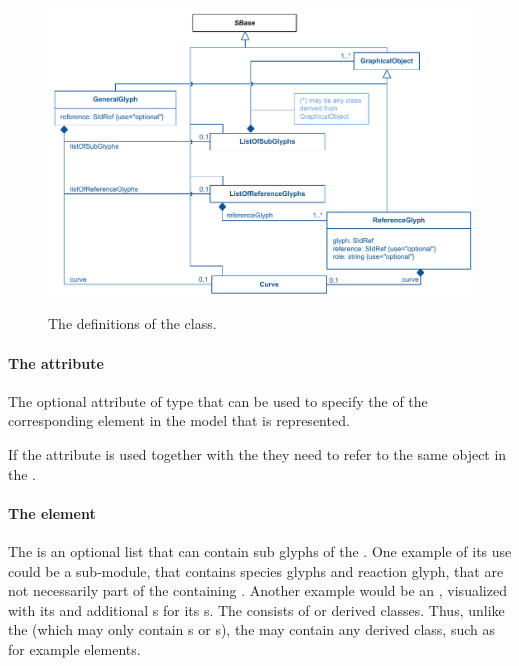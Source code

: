 \begin{figure}[!h]
\includegraphics[scale=0.9]{uml/layout-generalglyph-model-uml}\\
\label{uml:generalglyph}
\caption{The definitions of the \GeneralGlyph class.}
\end{figure}

\paragraph{The  attribute}
The optional  attribute of type  that 
can be used to specify the  of the corresponding element in 
the model that is represented. 

If the  attribute is used together with the  
they need to refer to the same object in the \Model.

\paragraph {The  element}
\label{listofsubglyphs-class}
The \ListOfSubGlyphs is an optional list that can contain sub glyphs of 
the \GeneralGlyph. One example of its use could be a sub-module, that 
contains species glyphs and reaction glyph, that are not necessarily 
part of the containing \Model. Another example would be an \Event, 
visualized with its \Trigger and additional {\GeneralGlyph}s for its 
{\EventAssignment}s. The \ListOfSubGlyphs consists of \GraphicalObject 
or derived classes. Thus, unlike the \ListOfAdditionalGraphicalObjects 
(which may only contain {\GraphicalObject}s or {\GeneralGlyph}s), the 
 may contain any derived class, such as for 
example \TextGlyph elements. 


